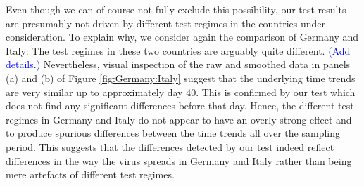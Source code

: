 \documentclass[a4paper,12pt]{article}
\numberwithin{equation}{section}
\begin{document}
Even though we can of course not fully exclude this possibility, our test results are presumably not driven by different test regimes in the countries under consideration. To explain why, we consider again the comparison of Germany and Italy: The test regimes in these two countries are arguably quite different. \textcolor{blue}{(Add details.)} Nevertheless, visual inspection of the raw and smoothed data in panels (a) and (b) of Figure \ref{fig:Germany:Italy} suggest that the underlying time trends are very similar up to approximately day $40$. This is confirmed by our test which does not find any significant differences before that day. Hence, the different test regimes in Germany and Italy do not appear to have an overly strong effect and to produce spurious differences between the time trends all over the sampling period. This suggests that the differences detected by our test indeed reflect differences in the way the virus spreads in Germany and Italy rather than being mere artefacts of different test regimes. 





\end{document}
